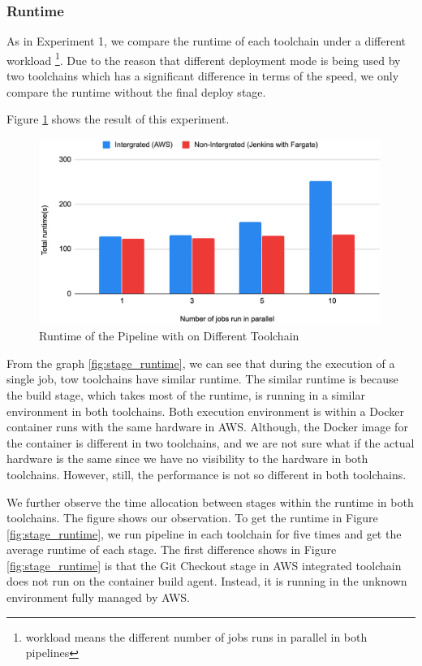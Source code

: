 \subsubsection{Runtime}
As in Experiment 1, we compare the runtime of each toolchain under a different workload \footnote{ workload means the different number of jobs runs in parallel in both pipelines}. Due to the reason that different deployment mode is being used by two toolchains which has a significant difference in terms of the speed, we only compare the runtime without the final deploy stage. 
\par
Figure \ref{fig:compareaws} shows the result of this experiment. 
\begin{figure}[h]
    \centering
    \includegraphics[width=0.99\textwidth]{pics/compare-aws.png}
    \caption{Runtime of the Pipeline with on Different Toolchain}
    \label{fig:compareaws}
    \end{figure}
From the graph \ref{fig:stage_runtime}, we can see that during the execution of a single job, tow toolchains have similar runtime. The similar runtime is because the build stage, which takes most of the runtime, is running in a similar environment in both toolchains. Both execution environment is within a Docker container runs with the same hardware in AWS. Although, the Docker image for the container is different in two toolchains, and we are not sure what if the actual hardware is the same since we have no visibility to the hardware in both toolchains. However, still, the performance is not so different in both toolchains.
\par
We further observe the time allocation between stages within the runtime in both toolchains. The figure shows our observation. To get the runtime in Figure \ref{fig:stage_runtime}, we run pipeline in each toolchain for five times and get the average runtime of each stage. The first difference shows in Figure \ref{fig:stage_runtime} is that the Git Checkout stage in AWS integrated toolchain does not run on the container build agent. Instead, it is running in the unknown environment fully managed by AWS.
